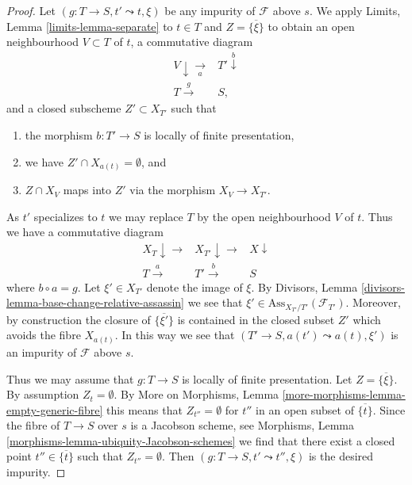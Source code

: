 \begin{proof}
Let $(g : T \to S, t' \leadsto t, \xi)$ be any impurity of
$\mathcal{F}$ above $s$. We apply
Limits, Lemma \ref{limits-lemma-separate}
to $t \in T$ and $Z = \overline{\{\xi\}}$ to obtain an open neighbourhood
$V \subset T$ of $t$, a commutative diagram
$$
\begin{array}{cc}V \downarrow\underset{a}{\longrightarrow} & T' \overset{b}{\downarrow} \\ T \overset{g}{\longrightarrow} & S,\end{array}
$$
and a closed subscheme $Z' \subset X_{T'}$ such that
\begin{enumerate}
\item the morphism $b : T' \to S$ is locally of finite presentation,
\item we have $Z' \cap X_{a(t)} = \emptyset$, and
\item $Z \cap X_V$ maps into $Z'$ via the morphism $X_V \to X_{T'}$.
\end{enumerate}
As $t'$ specializes to $t$ we may replace $T$ by the open neighbourhood
$V$ of $t$. Thus we have a commutative diagram
$$
\begin{array}{ccc}X_T \downarrow\longrightarrow & X_{T'} \downarrow\longrightarrow & X \downarrow \\ T \overset{a}{\longrightarrow} & T' \overset{b}{\longrightarrow} & S\end{array}
$$
where $b \circ a = g$. Let $\xi' \in X_{T'}$ denote the
image of $\xi$. By
Divisors, Lemma \ref{divisors-lemma-base-change-relative-assassin}
we see that $\xi' \in \text{Ass}_{X_{T'}/T'}(\mathcal{F}_{T'})$.
Moreover, by construction the closure of $\overline{\{\xi'\}}$
is contained in the closed subset $Z'$ which avoids the fibre
$X_{a(t)}$. In this way we see that $(T' \to S, a(t') \leadsto a(t), \xi')$
is an impurity of $\mathcal{F}$ above $s$.

\medskip\noindent
Thus we may assume that $g : T \to S$ is locally of finite presentation.
Let $Z = \overline{\{\xi\}}$. By assumption $Z_t = \emptyset$. By
More on Morphisms, Lemma \ref{more-morphisms-lemma-empty-generic-fibre}
this means that $Z_{t''} = \emptyset$ for $t''$ in an open subset
of $\overline{\{t\}}$. Since the fibre of
$T \to S$ over $s$ is a Jacobson scheme, see
Morphisms, Lemma \ref{morphisms-lemma-ubiquity-Jacobson-schemes}
we find that there exist a closed point $t'' \in \overline{\{t\}}$ such that
$Z_{t''} = \emptyset$. Then $(g : T \to S, t' \leadsto t'', \xi)$ is the
desired impurity.
\end{proof}

